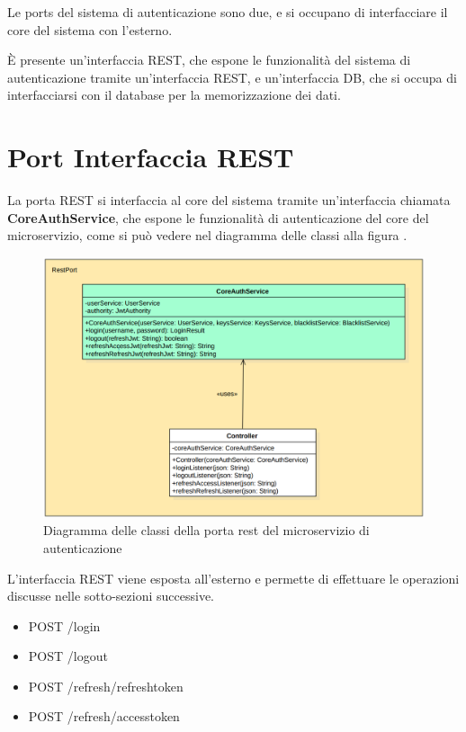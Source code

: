 Le ports del sistema di autenticazione sono due, e si occupano di interfacciare il core del sistema con l'esterno.

È presente un'interfaccia REST, che espone le funzionalità del sistema di autenticazione tramite un'interfaccia REST, e un'interfaccia DB, che si occupa di interfacciarsi con il database per la memorizzazione dei dati.

\section{Port Interfaccia REST}

La porta REST si interfaccia al core del sistema tramite un'interfaccia chiamata \textbf{CoreAuthService}, che espone le funzionalità di autenticazione del core del microservizio, come si può vedere nel diagramma delle classi alla figura .
\begin{figure}[ht]
    \centering
    \includegraphics[width=\textwidth]{img/classi_portrest.png}
    \caption{Diagramma delle classi della porta rest del microservizio di autenticazione}
    \label{fig:classi_portrest}
\end{figure}

L'interfaccia REST viene esposta all'esterno e permette di effettuare le operazioni discusse nelle sotto-sezioni successive.

\begin{itemize}
    \item POST /login
    \item POST /logout
    \item POST /refresh/refreshtoken
    \item POST /refresh/accesstoken
\end{itemize}

